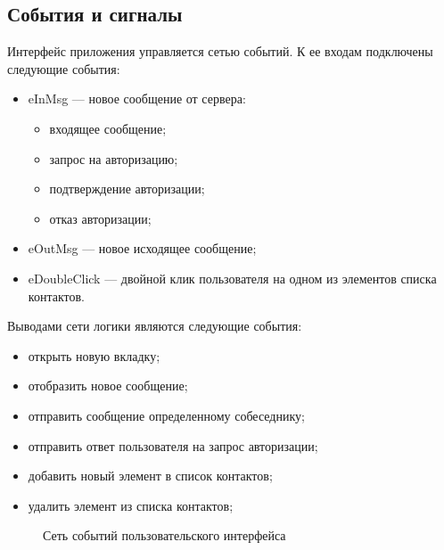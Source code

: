 \subsection{События и сигналы}\label{events_and_signals}
Интерфейс приложения управляется сетью событий.
К ее входам подключены следующие события:
\begin{itemize}
    \item eInMsg --- новое сообщение от сервера:
    \begin{itemize}
        \item входящее сообщение;
        \item запрос на авторизацию;
        \item подтверждение авторизации;
        \item отказ авторизации;
    \end{itemize}
    \item eOutMsg --- новое исходящее сообщение;
    \item eDoubleClick --- двойной клик пользователя на одном из элементов списка контактов.
\end{itemize}
Выводами сети логики являются следующие события:
\begin{itemize}
    \item открыть новую вкладку;
    \item отобразить новое сообщение;
    \item отправить сообщение определенному собеседнику;
    \item отправить ответ пользователя на запрос авторизации;
    \item добавить новый элемент в список контактов;
    \item удалить элемент из списка контактов;
\end{itemize}

\begin{figure}[p]
\centering

\caption{Сеть событий пользовательского интерфейса}
\label{netowrk}
\end{figure}

